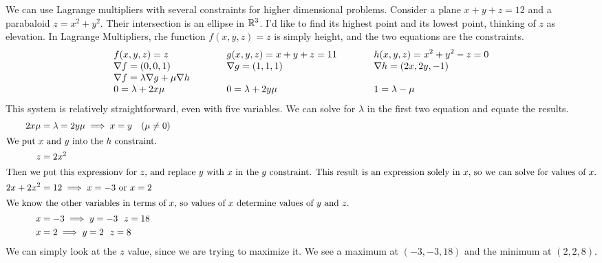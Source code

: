 \documentclass[fleqn,letterpaper]{report}
\begin{document}
\begin{example}
We can use Lagrange multipliers with several constraints for
higher dimensional problems. Consider a plane $x +y+ z = 12$
and a parabaloid $z = x^2 +y^2$. Their intersection is an
ellipse in $\mathbb{R}^3$. I'd like to find its highest point and its
lowest point, thinking of $z$ as elevation. In Lagrange
Multipliers, rhe function $f(x,y,z) = z$ is simply height, and
the two equations are the constraints. 
\begin{displaymath}
\begin{array}{*3{>{\displaystyle}l}}
f(x,y,z) = z &
\hspace{1cm} g(x,y,z) = x + y + z = 11 &
\hspace{1cm} h(x,y,z) = x^2 + y^2 - z = 0 \\
\nabla f = (0,0,1) &
\hspace{1cm} \nabla g = (1,1,1) &
\hspace{1cm} \nabla h = (2x, 2y, -1) \\
\nabla f = \lambda \nabla g + \mu \nabla h & & \\
0 = \lambda + 2 x \mu &
\hspace{1cm} 0 = \lambda + 2y \mu &
\hspace{1cm} 1 = \lambda - \mu 
\end{array}
\end{displaymath}
This system is relatively straightforward, even with five
variables. We can solve for $\lambda$ in the first two
equation and equate the results.
\begin{align*}
2x\mu & = \lambda = 2 y \mu \implies x = y \ \ \ ( \mu \neq
0) \\
\intertext{We put $x$ and $y$ into the $h$ constraint.}
z & = 2x^2 \\
\intertext{Then we put this expressionv for $z$, and replace
$y$ with $x$ in the $g$ constraint. This result is an
expression solely in $x$, so we can solve for values of $x$.}
2x + 2x^2 & = 12 \implies x = -3 \text{ or } x = 2 \\
\intertext{We know the other variables in terms of $x$, so
values of $x$ determine values of $y$ and $z$. }
x & = -3 \implies y = -3 \ \ z = 18 \\
x & = 2 \implies y = 2 \ \ z = 8 
\end{align*}
We can simply look at the $z$ value, since we are trying to
maximize it. We see a maximum at $(-3, -3, 18)$ and the
minimum at $(2,2,8)$. 
\end{example}
\end{document}
